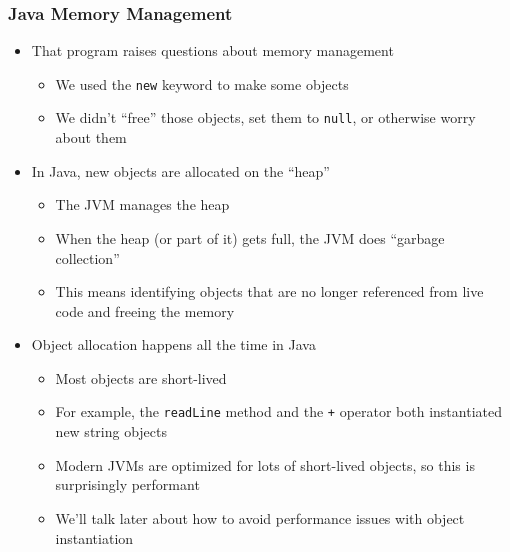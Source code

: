 \documentclass{beamer}
\begin{document}
\begin{frame}
\frametitle{Java Memory Management}
\begin{itemize}
\item That program raises questions about memory management
\begin{itemize}
\item We used the \texttt{new} keyword to make some objects
\item We didn't ``free'' those objects, set them to \texttt{null}, or otherwise worry about them
\end{itemize}
\item In Java, new objects are allocated on the ``heap''
\begin{itemize}
\item The JVM manages the heap
\item When the heap (or part of it) gets full, the JVM does ``garbage collection''
\item This means identifying objects that are no longer referenced from live code and freeing the memory
\end{itemize}
\item Object allocation happens all the time in Java
\begin{itemize}
\item Most objects are short-lived
\item For example, the \texttt{readLine} method and the \texttt{+} operator both instantiated new string objects
\item Modern JVMs are optimized for lots of short-lived objects, so this is surprisingly performant
\item We'll talk later about how to avoid performance issues with object instantiation
\end{itemize}
\end{itemize}
\end{frame}
\end{document}
